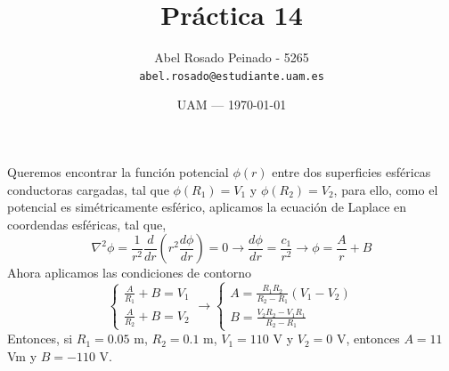 \documentclass{article}
\title{Práctica 14} %
\author{Abel Rosado Peinado - 5265\\ \texttt{abel.rosado@estudiante.uam.es}} %
\date{UAM --- \today} %
\begin{document}
\maketitle %
\noindent Queremos encontrar la función potencial $\phi(r)$ entre dos superficies esféricas conductoras cargadas, tal que $\phi(R_1) = V_1$ y $\phi(R_2) = V_2$, para ello, como el potencial es simétricamente esférico, aplicamos la ecuación de Laplace en coordendas esféricas, tal que,
\[\nabla^2 \phi = \frac{1}{r^2} \frac{d}{dr}\left(r^2 \frac{d \phi}{dr}\right) = 0 \rightarrow \frac{d \phi}{dr} = \frac{c_1}{r^2} \rightarrow \phi = \frac{A}{r}+ B\]
Ahora aplicamos las condiciones de contorno
\[\left\{\begin{matrix}
	\frac{A}{R_1}+ B = V_1 \\ \frac{A}{R_2}+ B = V_2
\end{matrix}\right. \rightarrow \left\{\begin{matrix}
	A = \frac{R_1 R_2}{R_2-R_1}(V_1-V_2) \\ B = \frac{V_2 R_2 - V_1 R_1}{R_2-R_1} \phantom{---}
\end{matrix}\right.\] 
Entonces, si $R_1 = 0.05 $ m, $R_2 = 0.1$ m, $V_1 = 110$ V y $V_2 = 0$ V, entonces $A = 11 $ Vm y $B = -110$ V.
\end{document}
